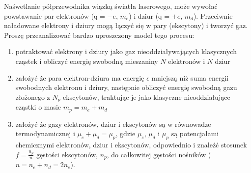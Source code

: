 \documentclass[11pt,a4paper]{article}
\begin{document}
Naśwetlanie półprzewodnika wiązką światła laserowego, może wywołać powstawanie par elektronów 
(q = $-e$, $m_e$) i dziur (q = $+e$, $m_d$). Przeciwnie naładowane elektrony i dziury
mogą łączyć się w pary (ekscytony) i tworzyć gaz. 
Proszę przeanalizować bardzo uproszczony model tego procesu:
\begin{enumerate}

\item  potraktować elektrony i dziury jako gaz nieoddziaływających klasycznych cząstek i obliczyć 
       energię swobodną mieszaniny $N$ elektronów i $N$ dziur
\item założyć że para elektron-dziura ma energię $\epsilon$ mniejszą niż suma energii swobodnych
      elektronu i dziury, następnie obliczyć energię swobodną gazu złożonego z $N_p$ ekscytonów, 
      traktując je jako klasyczne nieoddziałujące cząstki o masie $m_p = m_e + m_d$ 
\item założyć że gazy elektronów, dziur i ekscytonów są w równowadze termodynamicznej
      i $\mu_{e} + \mu_{d} = \mu_{p}$, gdzie $\mu_e$, $\mu_d$ i $\mu_p$ są potencjałami chemicznymi
      elektronów, dziur i ekscytonów, odpowiednio i znaleźć stosunek $f = \frac{n_p}{n}$ gęstości ekscytonów, 
      $n_p$, do całkowitej gęstości nośników ($n = n_e + n_d = 2n_e$).
\end{enumerate}
\end{document}
